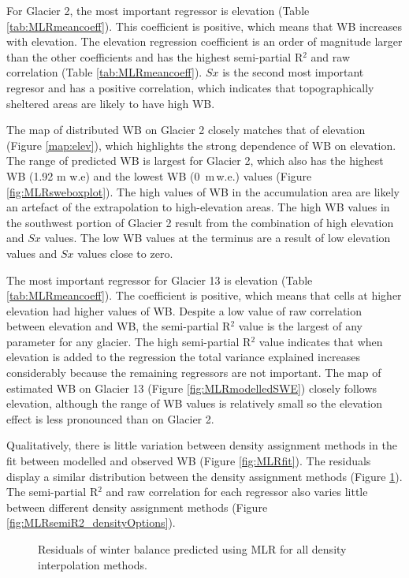 \documentclass{sfuthesis}
\begin{document}
For Glacier 2, the most important regressor is elevation (Table \ref{tab:MLRmeancoeff}). This coefficient is positive, which means that WB increases with elevation. The elevation regression coefficient is an order of magnitude larger than the other coefficients and has the highest semi-partial R$^2$ and raw correlation (Table \ref{tab:MLRmeancoeff}). $Sx$ is the second most important regresor and has a positive correlation, which indicates that topographically sheltered areas are likely to have high WB. 

The map of distributed WB on Glacier 2 closely matches that of elevation (Figure \ref{map:elev}), which highlights the strong dependence of WB on elevation. The range of predicted WB is largest for Glacier 2, which also has the highest WB (1.92 m w.e) and the lowest WB (0 \,m\,w.e.) values (Figure \ref{fig:MLRsweboxplot}). The high values of WB in the accumulation area are likely an artefact of the extrapolation to high-elevation areas. The high WB values in the southwest portion of Glacier 2 result from the combination of high elevation and $Sx$ values. The low WB values at the terminus are a result of low elevation values and $Sx$ values close to zero. 

The most important regressor for Glacier 13 is elevation (Table \ref{tab:MLRmeancoeff}). The coefficient is positive, which means that cells at higher elevation had higher values of WB. Despite a low value of raw correlation between elevation and WB, the semi-partial R$^2$ value is the largest of any parameter for any glacier. The high semi-partial R$^2$ value indicates that when elevation is added to the regression the total variance explained increases considerably because the remaining regressors are not important. The map of estimated WB on Glacier 13 (Figure \ref{fig:MLRmodelledSWE}) closely follows elevation, although the range of WB values is relatively small so the elevation effect is less pronounced than on Glacier 2. 

Qualitatively, there is little variation between density assignment methods in the fit between modelled and observed WB (Figure \ref{fig:MLRfit}). The residuals display a similar distribution between the density assignment methods (Figure \ref{fig:MLRresiduals_all}). The semi-partial R$^2$ and raw correlation for each regressor also varies little between different density assignment methods (Figure \ref{fig:MLRsemiR2_densityOptions}).


\begin{figure}[H]
	\caption{Residuals of winter balance predicted using MLR for all density interpolation methods.}
	\label{fig:MLRresiduals_all}
\end{figure}
\end{document}
